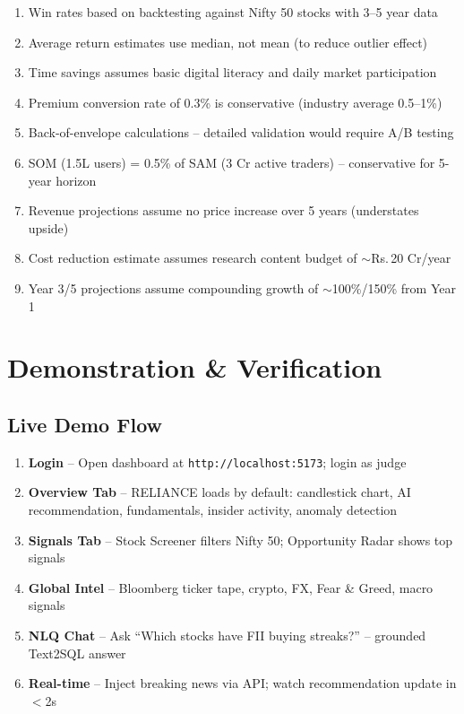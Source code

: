 \documentclass[11pt, a4paper]{article}
\newcommand{\Rs}{Rs.\,}
\begin{document}
\begin{enumerate}[leftmargin=1.8em, itemsep=1pt]
  \item Win rates based on backtesting against Nifty 50 stocks with 3--5 year data
  \item Average return estimates use median, not mean (to reduce outlier effect)
  \item Time savings assumes basic digital literacy and daily market participation
  \item Premium conversion rate of 0.3\% is conservative (industry average 0.5--1\%)
  \item Back-of-envelope calculations -- detailed validation would require A/B testing
  \item SOM (1.5L users) = 0.5\% of SAM (3 Cr active traders) -- conservative for 5-year horizon
  \item Revenue projections assume no price increase over 5 years (understates upside)
  \item Cost reduction estimate assumes research content budget of $\sim$\Rs{}20 Cr/year
  \item Year 3/5 projections assume compounding growth of $\sim$100\%/150\% from Year 1
\end{enumerate}

\section{Demonstration \& Verification}

\subsection{Live Demo Flow}

\begin{enumerate}[leftmargin=1.8em, itemsep=3pt]
  \item \textbf{Login} -- Open dashboard at \texttt{http://localhost:5173}; login as judge
  \item \textbf{Overview Tab} -- RELIANCE loads by default: candlestick chart, AI recommendation,
        fundamentals, insider activity, anomaly detection
  \item \textbf{Signals Tab} -- Stock Screener filters Nifty 50; Opportunity Radar shows top signals
  \item \textbf{Global Intel} -- Bloomberg ticker tape, crypto, FX, Fear \& Greed, macro signals
  \item \textbf{NLQ Chat} -- Ask ``Which stocks have FII buying streaks?'' -- grounded Text2SQL answer
  \item \textbf{Real-time} -- Inject breaking news via API; watch recommendation update in $<$2s
\end{enumerate}
\end{document}
